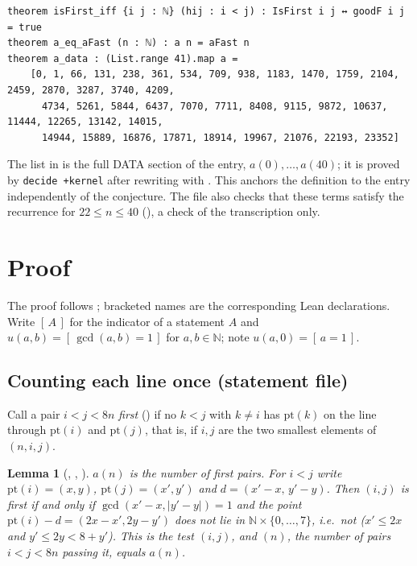 \documentclass[11pt]{amsart}
\theoremstyle{plain}
\newtheorem{lemma}[theorem]{Lemma}
\theoremstyle{definition}
\newcommand{\N}{\mathbb{N}}
\newcommand{\ind}[1]{[\,#1\,]}
\begin{document}
\begin{lstlisting}
theorem isFirst_iff {i j : ℕ} (hij : i < j) : IsFirst i j ↔ goodF i j = true
theorem a_eq_aFast (n : ℕ) : a n = aFast n
theorem a_data : (List.range 41).map a =
    [0, 1, 66, 131, 238, 361, 534, 709, 938, 1183, 1470, 1759, 2104, 2459, 2870, 3287, 3740, 4209,
      4734, 5261, 5844, 6437, 7070, 7711, 8408, 9115, 9872, 10637, 11444, 12265, 13142, 14015,
      14944, 15889, 16876, 17871, 18914, 19967, 21076, 22193, 23352]
\end{lstlisting}
The list in  is the full DATA section of the entry, $a(0),\dots,a(40)$; it is proved by \texttt{decide +kernel} after rewriting with . This anchors the definition to the entry independently of the conjecture. The file also checks that these terms satisfy the recurrence for $22\le n\le40$ (), a check of the transcription only.

\section{Proof}\label{sec:proof}

The proof follows ; bracketed names are the corresponding Lean declarations. Write $\ind{A}$ for the indicator of a statement $A$ and $u(a,b)=\ind{\gcd(a,b)=1}$ for $a,b\in\N$; note $u(a,0)=\ind{a=1}$.

\subsection{Counting each line once (statement file)}
Call a pair $i<j<8n$ \emph{first} () if no $k<j$ with $k\ne i$ has $\mathrm{pt}(k)$ on the line through $\mathrm{pt}(i)$ and $\mathrm{pt}(j)$, that is, if $i,j$ are the two smallest elements of $(n,i,j)$.

\begin{lemma}[, , ]\label{lem:first}
$a(n)$ is the number of first pairs. For $i<j$ write $\mathrm{pt}(i)=(x,y)$, $\mathrm{pt}(j)=(x',y')$ and $d=(x'-x,\,y'-y)$. Then $(i,j)$ is first if and only if $\gcd(x'-x,|y'-y|)=1$ and the point $\mathrm{pt}(i)-d=(2x-x',2y-y')$ does not lie in $\N\times\{0,\dots,7\}$, i.e.\ not ($x'\le2x$ and $y'\le 2y<8+y'$). This is the test $(i,j)$, and $(n)$, the number of pairs $i<j<8n$ passing it, equals $a(n)$.
\end{lemma}
\end{document}
